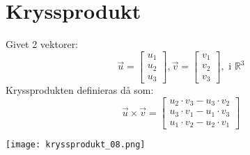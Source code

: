 
\section{Kryssprodukt} %
\label{sec:kryssprodukt}
\begin{Def}
    Givet 2 vektorer:
    \[
        \vec{u} = \begin{bmatrix} u_1 \\ u_2 \\ u_3 \end{bmatrix}, \vec{v} = \begin{bmatrix} v_1 \\ v_2 \\ v_3 \end{bmatrix}, \mbox{ i } \mathbb{R}^3
    \]
    Kryssprodukten definieras då som:
    \begin{equation}
        \vec{u} \times \vec{v} = \begin{bmatrix} u_2 \cdot v_3 - u_3 \cdot v_2 \\ u_3 \cdot v_1 - u_1 \cdot v_3 \\ u_1 \cdot v_2 - u_2 \cdot v_1\end{bmatrix}
    \end{equation}
    
\end{Def}
\begin{center}
  \texttt{[image: kryssprodukt\_08.png]}
\end{center}
\samepage
\noindent

